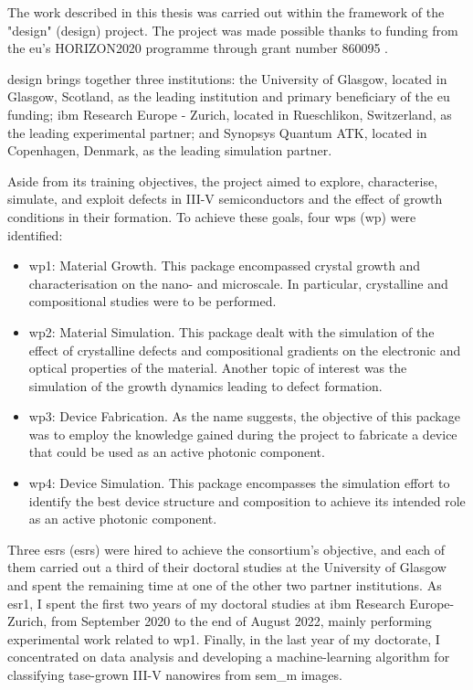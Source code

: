 The work described in this thesis was carried out within the framework of the "\acl{design}" (\acs{design}) project. The project was made possible thanks to funding from the \acl{eu}'s HORIZON2020 programme through grant number 860095 \cite{CordisDESIGN}.
\par
\Acs{design} brings together three institutions: the University of Glasgow, located in Glasgow, Scotland, as the leading institution and primary beneficiary of the \acs{eu} funding; \acs{ibm} Research Europe - Zurich, located in Rueschlikon, Switzerland, as the leading experimental partner; and Synopsys Quantum ATK, located in Copenhagen, Denmark, as the leading simulation partner.
\par
Aside from its training objectives, the project aimed to explore, characterise, simulate, and exploit defects in III-V semiconductors and the effect of growth conditions in their formation. To achieve these goals, four \acl{wp}s (\acs{wp}) were identified:
\begin{itemize}
    \item \acs{wp}1: Material Growth. This package encompassed crystal growth and characterisation on the nano- and microscale. In particular, crystalline and compositional studies were to be performed.
    \item \acs{wp}2: Material Simulation. This package dealt with the simulation of the effect of crystalline defects and compositional gradients on the electronic and optical properties of the material. Another topic of interest was the simulation of the growth dynamics leading to defect formation.
    \item \acs{wp}3: Device Fabrication. As the name suggests, the objective of this package was to employ the knowledge gained during the project to fabricate a device that could be used as an active photonic component.
    \item \acs{wp}4: Device Simulation. This package encompasses the simulation effort to identify the best device structure and composition to achieve its intended role as an active photonic component.
\end{itemize}
\par
Three \acl{esr}s (\acs{esr}s) were hired to achieve the consortium's objective, and each of them carried out a third of their doctoral studies at the University of Glasgow and spent the remaining time at one of the other two partner institutions. As \acs{esr}1, I spent the first two years of my doctoral studies at \acs{ibm} Research Europe- Zurich, from September 2020 to the end of August 2022, mainly performing experimental work related to \acs{wp}1. Finally, in the last year of my doctorate, I concentrated on data analysis and developing a machine-learning algorithm for classifying \acs{tase}-grown III-V nanowires from \acf{sem_m} images.